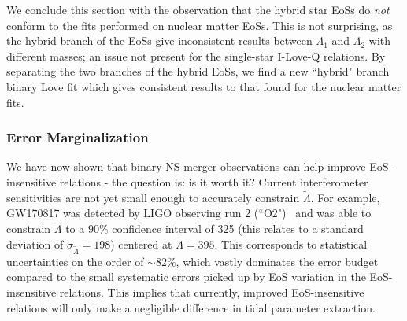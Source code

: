 \documentclass[prd,twocolumn,nofootinbib,superscriptaddress,amsmath,amssymb]{revtex4-1}
\begin{document}
We conclude this section with the observation that the hybrid star EoSs do \emph{not} conform to the fits performed on nuclear matter EoSs.
This is not surprising, as the hybrid branch of the EoSs give inconsistent results between $\Lambda_1$ and $\Lambda_2$ with different masses; an issue not present for the single-star I-Love-Q relations.
By separating the two branches of the hybrid EoSs, we find a new ``hybrid" branch binary Love fit which gives consistent results to that found for the nuclear matter fits. {}

\subsubsection{Error Marginalization}

{} 

We have now shown that binary NS merger observations can help improve EoS-insensitive relations - the question is: is it worth it?
Current interferometer sensitivities are not yet small enough to accurately constrain $\tilde{\Lambda}$.
For example, GW170817 was detected by LIGO observing run 2 (``O2")~\cite{aLIGO} and was able to constrain $\tilde{\Lambda}$ to a $90\%$ confidence interval of 325 (this relates to a standard deviation of $\sigma_{\tilde{\Lambda}}=198$) centered at $\tilde{\Lambda}=395$.
This corresponds to statistical uncertainties on the order of $\sim 82\%$, which vastly dominates the error budget compared to the small systematic errors picked up by EoS variation in the EoS-insensitive relations.
This implies that currently, improved EoS-insensitive relations will only make a negligible difference in tidal parameter extraction.
\end{document}

